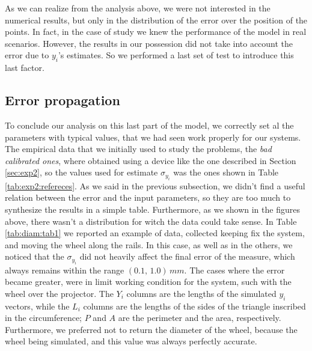 As we can realize from the analysis above, we were not interested in the numerical results, but only in the distribution of the error over the position of the points. In fact, in the case of study we knew the performance of the model in real scenarios. However, the results in our possession did not take into account the error due to $y_i$'s estimates. So we performed a last set of test to introduce this last factor.

\subsection{Error propagation} %
To conclude our analysis on this last part of the model, we correctly set al the parameters with typical values, that we had seen work properly for our systems. The empirical data that we initially used to study the problems, the \textit{bad calibrated ones}, where obtained using a device like the one described in Section \ref{sec:exp2}, so the values used for estimate $\sigma_{y_i}$ was the ones shown in Table \ref{tab:exp2:refereces}. 
As we said in the previous subsection, we didn't find a useful relation between the error and the input parameters, so they are too much to synthesize the results in a simple table. Furthermore, as we shown in the figures above, there wasn't a distribution for witch the data could take sense. In Table \ref{tab:diam:tab1} we reported an example of data, collected keeping fix the system, and moving the wheel along the rails. In this case, as well as in the others, we noticed that the $\sigma_{y_i}$ did not heavily affect the final error of the measure, which always remains within the range $\left(0.1, \, 1.0\right) \, mm$. The cases where the error became greater, were in limit working condition for the system, such with the wheel over the projector. The $Y_i$ columns are the lengths of the simulated $y_i$ vectors, while the $L_i$ columns are the lengths of the sides of the triangle inscribed in the circumference; $P$ and $A$ are the perimeter and the area, respectively. Furthermore, we preferred not to return the diameter of the wheel, because the wheel being simulated, and this value was always perfectly accurate.

%
